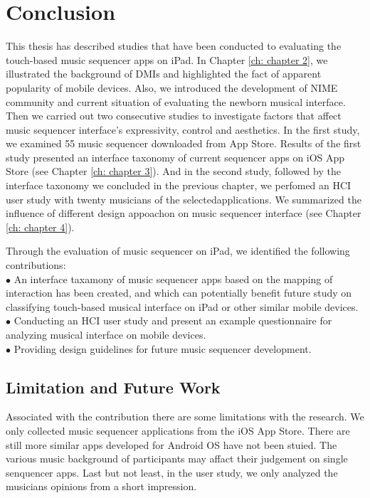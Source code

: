\pagestyle{fancy}
\rhead{\thepage}
\chapter{Conclusion}
\label{ch: chapter 5}

This thesis has described studies that have been conducted to evaluating the touch-based music sequencer apps on iPad. In Chapter \ref{ch: chapter 2}, we illustrated the background of DMIs and highlighted the fact of apparent popularity of mobile devices. Also, we introduced the development of NIME community and current situation of evaluating the newborn musical interface. Then we carried out two consecutive studies to investigate factors that affect music sequencer interface's expressivity, control and aesthetics. In the first study, we examined 55 music sequencer downloaded from App Store. Results of the first study presented an interface taxonomy of current sequencer apps on iOS App Store (see Chapter \ref{ch: chapter 3}). And in the second study, followed by the interface taxonomy we concluded in the previous chapter, we perfomed an HCI user study with twenty musicians of the selectedapplications. We summarized the influence of different design appoachon on music sequencer interface (see Chapter \ref{ch: chapter 4}).

Through the evaluation of music sequencer on iPad, we identified the following contributions: \\
\qquad$\bullet$ An interface taxamony of music sequencer apps based on the mapping of interaction has been created, and which can potentially benefit future study on classifying touch-based musical interface on iPad or other similar mobile devices.\\
\qquad$\bullet$ Conducting an HCI user study and present an example questionnaire for analyzing musical interface on mobile devices.\\
\qquad$\bullet$ Providing design guidelines for future music sequencer development.

\section{Limitation and Future Work}

Associated with the contribution there are some limitations with the research. We only collected music sequencer applications from the iOS App Store. There are still more similar apps developed for Android OS have not been stuied.
The various music background of participants may affact their judgement on single senquencer apps. Last but not least, in the user study, we only analyzed the musicians opinions from a short impression.

